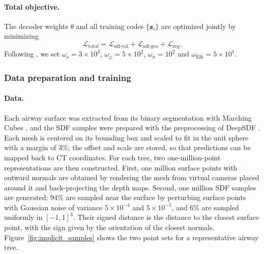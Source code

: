 \paragraph{Total objective.}             %
The decoder weights $\theta$ and all training codes $\{\mathbf{z}_i\}$ are optimized jointly
by minimizing
\begin{equation}
  \mathcal{L}_{\mathrm{total}} = \mathcal{L}_{\mathrm{sdf\text{-}val}}
  + \mathcal{L}_{\mathrm{sdf\text{-}geo}} + \mathcal{L}_{\mathrm{reg}}.
  \label{eq:implicit_total}              %
\end{equation}
Following \citet{zhang2024}, we set $\omega_s = 3\times10^3$,
$\omega_\varphi = 5\times10^2$, $\omega_n = 10^2$ and $\omega_{\mathrm{Eik}} = 5\times10^1$.

\subsubsection{Data preparation and training}  %
\label{sec:implicit_training}            %
\label{sec:dgci_training}                %

\paragraph{Data.}                        %
Each airway surface was extracted from its binary segmentation with Marching
Cubes \cite{lorensen1987}, and the SDF samples were prepared with the preprocessing of
DeepSDF \cite{park2019}. Each mesh is centered on its bounding box and scaled to fit in the
unit sphere with a margin of 3\%; the offset and scale are stored, so that predictions can
be mapped back to CT coordinates. For each tree, two one-million-point representations are
then constructed. First, one million surface points with outward normals are obtained by
rendering the mesh from virtual cameras placed around it and back-projecting the depth maps.
Second, one million SDF samples are generated: 94\% are sampled near the surface by
perturbing surface points with Gaussian noise of variance $5\times10^{-4}$ and
$5\times10^{-5}$, and 6\% are sampled uniformly in $[-1,1]^3$. Their signed distance is the
distance to the closest surface point, with the sign given by the orientation of the closest
normals. Figure~\ref{fig:implicit_samples} shows the two point sets for a representative
airway tree.

